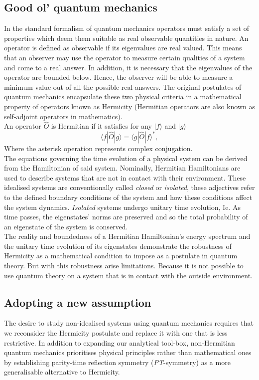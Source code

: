 \documentclass[10pt, a4paper, singlespacing, headsepline]{article}
\newcommand\PT{\textit{PT}}
\begin{document}
\subsection{Good ol' quantum mechanics}
In the standard formalism of quantum mechanics operators must satisfy a set of properties which deem them suitable as real observable quantities in nature.
An operator is defined as observable if its eigenvalues are real valued. This means that an observer may use the operator to measure certain qualities of a system and come to a real answer. In addition, it is  necessary that the eigenvalues of the operator are bounded below. Hence, the observer will be able to measure a minimum value out of all the possible real answers. 
The original postulates of quantum mechanics encapsulate these two physical criteria in a mathematical property of operators known as Hermicity (Hermitian operators are also known as self-adjoint operators in mathematics).\\
An operator $\hat{O}$ is Hermitian if it satisfies for any $|f \rangle$ and $|g\rangle$
\begin{equation}
\langle f|\widehat{O}|g\rangle = \langle g|\widehat{O}|f \rangle^{*},
\end{equation}  
Where the asterisk operation represents complex conjugation.\\
The equations governing the time evolution of a physical system can be derived from the Hamiltonian of said system\cite{BenderPT}. Nominally, Hermitian Hamiltonians are used to describe systems that are not in contact with their environment. These idealised systems are conventionally called \textit{closed} or \textit{isolated}, these adjectives refer to the defined boundary conditions of the system and how these conditions affect the system dynamics. \textit{Isolated} systems undergo unitary time evolution, Ie. As time passes, the eigenstates' norms are preserved and so the total probability of an eigenstate of the system is conserved. 
\\The reality and boundedness of a Hermitian Hamiltonian's energy spectrum and the unitary time evolution of its eigenstates demonstrate the robustness of Hermicity as a mathematical condition to impose as a postulate in quantum theory.
But with this robustness arise limitations. Because it is not possible to use quantum theory on a system that is in contact with the outside environment.

\subsection{Adopting a new assumption}
The desire to study non-idealised systems using quantum mechanics requires that we reconsider the Hermicity postulate and replace it with one that is less restrictive.
In addition to expanding our analytical tool-box, non-Hermitian quantum mechanics prioritises physical principles rather than mathematical ones by establishing parity-time reflection symmetry (\PT-symmetry) as a more generalisable alternative to Hermicity.
 
\end{document}
